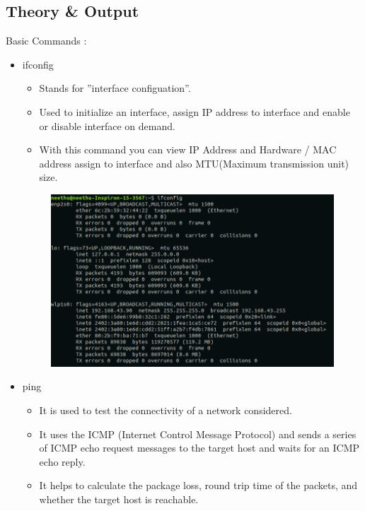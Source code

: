 \subsection{Theory \& Output}
\Large{Basic Commands :}
\begin{itemize}
    \item ifconfig
        \begin{itemize}
            \item Stands for ”interface configuation”. 
            \item Used to initialize an interface, assign IP address to interface and enable or disable interface on demand.
            \item With this command you can view IP Address and Hardware / MAC address assign to interface and also MTU(Maximum transmission unit) size.
        \end{itemize}
        \begin{figure}[h]
            \centering
            \includegraphics[scale=0.6]{img/e11.png}
        \end{figure}
    \item ping
        \begin{itemize}
            \item It is used to test the connectivity of a network considered.
            \item It uses the ICMP (Internet Control Message Protocol) and sends a series of ICMP echo request messages to the target host and waits for an ICMP echo reply.
            \item It helps to calculate the package loss, round trip time of the packets, and whether the target host is reachable.
        \end{itemize} 
        \begin{figure}[h]

\end{figure}
\end{itemize}
